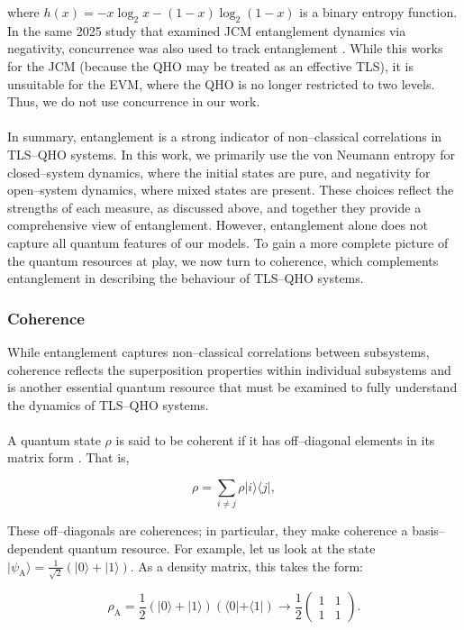 \documentclass[11pt]{article}
\begin{document}
where $h(x) = - x\log_2x - (1 - x)\log_2(1 -x)$ is a binary entropy function. In the same 2025 study that examined JCM entanglement dynamics via negativity, concurrence was also used to track entanglement \cite{Entanglement2025-Negativity}. While this works for the JCM (because the QHO may be treated as an effective TLS), it is unsuitable for the EVM, where the QHO is no longer restricted to two levels. Thus, we do not use concurrence in our work.\\
\\
In summary, entanglement is a strong indicator of non--classical correlations in TLS--QHO systems. In this work, we primarily use the von Neumann entropy for closed--system dynamics, where the initial states are pure, and negativity for open--system dynamics, where mixed states are present. These choices reflect the strengths of each measure, as discussed above, and together they provide a comprehensive view of entanglement. However, entanglement alone does not capture all quantum features of our models. To gain a more complete picture of the quantum resources at play, we now turn to coherence, which complements entanglement in describing the behaviour of TLS--QHO systems.

\subsubsection{Coherence} \label{sec:theory_sub_coh}

While entanglement captures non--classical correlations between subsystems, coherence reflects the superposition properties within individual subsystems and is another essential quantum resource that must be examined to fully understand the dynamics of TLS--QHO systems.\\
\\
A quantum state $\rho$ is said to be coherent if it has off--diagonal elements in its matrix form \cite{Coherence2017-Colloquium}. That is,

\begin{equation}
    \rho = \sum_{i\neq j}\rho|i\rangle\langle j|,
\end{equation}

These off--diagonals are coherences; in particular, they make coherence a basis--dependent quantum resource. For example, let us look at the state $|\psi_{\scriptscriptstyle \text{A}}\rangle = \frac{1}{\sqrt{2}}(|0\rangle + |1\rangle)$. As a density matrix, this takes the form:

\begin{equation*}
    \rho_{\scriptscriptstyle \text{A}} = \frac{1}{2}(|0\rangle + |1\rangle)(\langle0| +\langle1|) \rightarrow \frac{1}{2}
    \begin{pmatrix}
        1 & 1 \\
        1 & 1
    \end{pmatrix}.
\end{equation*}
\end{document}
